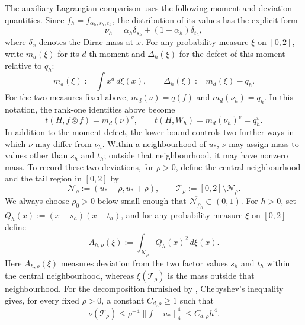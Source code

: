 The auxiliary Lagrangian comparison uses the following moment and deviation
quantities.  Since $f_h=f_{\alpha_h,s_h,t_h}$, the distribution of
its values has the explicit form
\begin{equation*}
  \nu_h=\alpha_h\delta_{s_h}+(1-\alpha_h)\delta_{t_h},
\end{equation*}
where $\delta_x$ denotes the Dirac mass at $x$.
For any probability measure $\xi$ on $[0,2]$, write $m_d(\xi)$ for its
$d$-th moment and $\Delta_h(\xi)$ for the defect of this moment relative to
$q_h$:
\begin{equation*}
  m_d(\xi):=\int x^d\,d\xi(x),
  \qquad
  \Delta_h(\xi):=m_d(\xi)-q_h.
\end{equation*}
For the two measures fixed above, $m_d(\nu)=q(f)$ and
$m_d(\nu_h)=q_h$.
In this notation, the rank-one identities above become
\begin{equation*}
  t(H,f\otimes f)=m_d(\nu)^v,
  \qquad
  t(H,W_h)=m_d(\nu_h)^v=q_h^v.
\end{equation*}
In addition to the moment defect, the lower bound controls two further ways in
which $\nu$ may differ from $\nu_h$.  Within a neighbourhood of $u_*$, $\nu$
may assign mass to values other than $s_h$ and $t_h$; outside that
neighbourhood, it may have nonzero mass.  To record these two deviations, for
$\rho>0$, define the central neighbourhood and the tail region in $[0,2]$ by
\[
  \mathcal N_\rho:=(u_*-\rho,u_*+\rho),
  \qquad
  \mathcal T_\rho:=[0,2]\setminus\mathcal N_\rho.
\]
We always choose $\rho_0>0$ below small enough that
$\overline{\mathcal N_{\rho_0}}\subset(0,1)$.
For $h>0$, set $Q_h(x):=(x-s_h)(x-t_h)$, and for any probability measure
$\xi$ on $[0,2]$ define
\[
  A_{h,\rho}(\xi)
  :=\int_{\mathcal N_\rho}Q_h(x)^2\,d\xi(x).
\]
Here $A_{h,\rho}(\xi)$ measures deviation from the two factor values $s_h$
and $t_h$ within the central neighbourhood, whereas $\xi(\mathcal T_\rho)$ is
the mass outside that neighbourhood.  For the
decomposition furnished by ,
Chebyshev's inequality gives, for every fixed $\rho>0$, a constant
$C_{d,\rho}\ge1$ such that
\begin{equation}\label{eq:factor-tail-mass}
  \nu(\mathcal T_\rho)
  \le \rho^{-4}\|f-u_*\|_4^4
  \le C_{d,\rho}h^4.
\end{equation}

